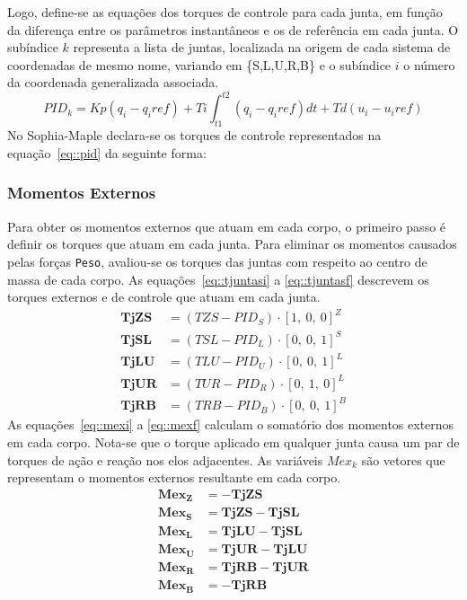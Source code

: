 Logo, define-se as equações dos torques de controle para cada junta, em função
da diferença entre os parâmetros instantâneos e os de referência em cada junta.
O subíndice $k$ representa a lista de juntas, localizada na origem de cada
sistema de coordenadas de mesmo nome, variando em \{S,L,U,R,B\} e o
subíndice $i$ o número da coordenada generalizada associada.
%
\begin{equation}
	PID_{k} = Kp(q_i-q_i{ref}) + Ti\int_{t1}^{t2} (q_i-q_i{ref})dt +
	Td(u_i-u_i{ref}) \label{eq::pid}
\end{equation}
%
No Sophia-Maple declara-se os torques de controle representados na
equação~\ref{eq::pid} da seguinte forma:

\bigskip {}

\subsubsection{Momentos Externos}

Para obter os momentos externos que atuam em cada corpo, o primeiro passo é
definir os torques que atuam em cada junta. Para eliminar os momentos causados
pelas forças \texttt{Peso}, avaliou-se os torques das juntas com respeito ao
centro de massa de cada corpo. As equações~\ref{eq::tjuntasi} a
\ref{eq::tjuntasf} descrevem os torques externos e de controle que atuam em cada
junta.
\begin{align}
	\mathbf{TjZS} &= (TZS - PID_{S})\cdot[1,~0,~0]^Z \label{eq::tjuntasi} \\
	\mathbf{TjSL} &= (TSL - PID_{L})\cdot[0,~0,~1]^S \\
	\mathbf{TjLU} &= (TLU - PID_{U})\cdot[0,~0,~1]^L \\
	\mathbf{TjUR} &= (TUR - PID_{R})\cdot[0,~1,~0]^L \\
	\mathbf{TjRB} &= (TRB - PID_{B})\cdot[0,~0,~1]^B \label{eq::tjuntasf}
\end{align}
%
As equações~\ref{eq::mexi} a \ref{eq::mexf} calculam o somatório dos momentos
externos em cada corpo. Nota-se que o torque aplicado em qualquer junta causa
um par de torques de ação e reação nos elos adjacentes. As variáveis $Mex_k$ são
vetores que representam o momentos externos resultante em cada
corpo.
%
\begin{align}
	\mathbf{Mex_{Z}} &= - \mathbf{TjZS } \label{eq::mexi}\\
	\mathbf{Mex_{S}} &= \mathbf{TjZS} - \mathbf{TjSL }\\
	\mathbf{Mex_{L}} &= \mathbf{TjLU }- \mathbf{TjSL }\\
	\mathbf{Mex_{U}} &= \mathbf{TjUR }- \mathbf{TjLU }\\
	\mathbf{Mex_{R}} &= \mathbf{TjRB }- \mathbf{TjUR }\\
	\mathbf{Mex_{B}} &= - \mathbf{TjRB} \label{eq::mexf}
\end{align}
%

